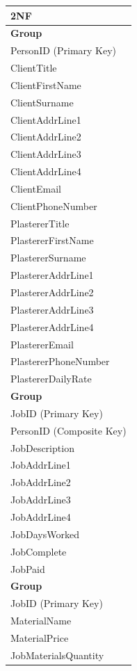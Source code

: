 \begin{flushleft}
    \begin{longtable}{|p{12cm}|}
        \hline
			 \textbf{2NF} \\ \hline
         \textbf{Group} \\ \hline
			PersonID (Primary Key) \\ 
          ClientTitle \\
			ClientFirstName \\
			ClientSurname \\
			ClientAddrLine1 \\
			ClientAddrLine2 \\
			ClientAddrLine3 \\
			ClientAddrLine4 \\
			ClientEmail \\
			ClientPhoneNumber \\
			PlastererTitle \\
			PlastererFirstName \\
			PlastererSurname \\
			PlastererAddrLine1 \\
			PlastererAddrLine2 \\
			PlastererAddrLine3 \\
			PlastererAddrLine4 \\
			PlastererEmail \\
			PlastererPhoneNumber \\
			PlastererDailyRate \\ \hline

			\textbf{Group} \\ \hline
			JobID (Primary Key) \\
			PersonID (Composite Key) \\
         JobDescription \\
			JobAddrLine1 \\
			JobAddrLine2 \\
			JobAddrLine3 \\
			JobAddrLine4 \\
			JobDaysWorked \\
			JobComplete \\
			JobPaid \\ \hline
		
			\textbf{Group} \\ \hline
			JobID (Primary Key) \\ 
			MaterialName \\
			MaterialPrice \\
			JobMaterialsQuantity \\


\end{longtable}
\end{flushleft}
